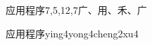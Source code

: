\begin{entry}{应用程序}{7,5,12,7}{⼴、⽤、⽲、⼴}
  \begin{phonetics}{应用程序}{ying4yong4cheng2xu4}
  \end{phonetics}
\end{entry}

